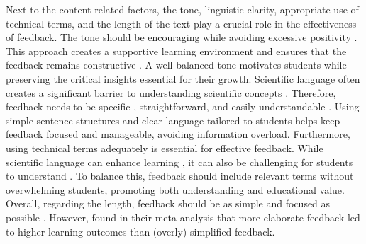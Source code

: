 Next to the content-related factors, the tone, linguistic clarity,  appropriate use of technical terms, and the length of the text play a crucial role in the effectiveness of feedback. 
The tone should be encouraging while avoiding excessive positivity \citep{kluger1996effects}. This approach creates a supportive learning environment and ensures that the feedback remains constructive \citep{brookhart2017give}. A well-balanced tone motivates students while preserving the critical insights essential for their growth.
%
Scientific language often creates a significant barrier to understanding scientific concepts \citep{gabel1999improving, cassels1983meaning}. Therefore, feedback needs to be specific \citep{moreno2004decreasing}, straightforward, and easily understandable \citep{brookhart2017give, ossenberg2019attributes, Mory2004}. Using simple sentence structures and clear language tailored to students helps keep feedback focused and manageable, avoiding information overload.
%
Furthermore, using technical terms adequately is essential for effective feedback. While scientific language can enhance learning \citep{fazio2019science}, it can also be challenging for students to understand \citep{vladuvsic2016understanding, hamnell2023scientific}. To balance this, feedback should include relevant terms without overwhelming students, promoting both understanding and educational value.
%
Overall, regarding the length, feedback should be as simple and focused as possible \citep{kulhavy1985conjoint}. However, \citet{van2015effects} found in their meta-analysis that more elaborate feedback led to higher learning outcomes than (overly) simplified feedback.



